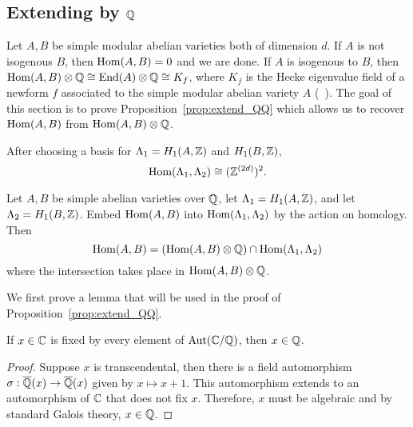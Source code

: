 \subsection{Extending by $\mathbb{Q}$}%
\label{sub:extending_by_qq_}

Let $A, B$ be simple modular abelian varieties both of dimension $d$. If $A$ is
not isogenous $B$, then $\operatorname{Hom}(A, B)=0$ and we are done. If $A$ is isogenous to
$B$, then $\operatorname{Hom}(A,B)\otimes \mathbb{Q} \cong \operatorname{End}(A)\otimes \mathbb{Q}\cong K_f$, where $K_f$
is the Hecke eigenvalue field of a newform $f$ associated to the simple modular
abelian variety $A$ (~\cite[Prop 7.14]{shimura:intro}). The goal of this section is to prove
Proposition~\ref{prop:extend_QQ} which allows us to recover $\operatorname{Hom}(A,B)$ from
$\operatorname{Hom}(A,B)\otimes \mathbb{Q}$.

After choosing a basis for $\Lambda_1 = H_1(A, \mathbb{Z})$ and $H_1(B, \mathbb{Z})$, 
\[
    \operatorname{Hom}(\Lambda_1, \Lambda_2) \cong (\mathbb{Z}^{(2d)})^2.
\]
\begin{proposition}%
    \label{prop:extend_QQ}
    Let $A, B$ be simple abelian varieties over $\mathbb{Q}$, let $\Lambda_1=H_1(A,
    \mathbb{Z})$, and let $\Lambda_2=H_1(B, \mathbb{Z})$. Embed $\operatorname{Hom}(A, B)$ into
    $\operatorname{Hom}(\Lambda_1, \Lambda_2)$ by the action on homology. Then
    \[
        \operatorname{Hom}(A, B) = 
        (\operatorname{Hom}(A, B) \otimes \mathbb{Q})\cap \operatorname{Hom}(\Lambda_1, \Lambda_2)
    \]
    where the intersection takes place in $\operatorname{Hom}(A,B)\otimes \mathbb{Q}$.
\end{proposition}

We first prove a lemma that will be used in the proof of
Proposition~\ref{prop:extend_QQ}.

\begin{lemma}%
    \label{lem:aut}
    If $x\in \mathbb{C}$ is fixed by every element of $\operatorname{Aut}(\mathbb{C}/\mathbb{Q})$, then $x\in
    \mathbb{Q}$.
\end{lemma}
\begin{proof}
    Suppose $x$ is transcendental, then there is a field automorphism
    $\sigma:\overline{\mathbb{Q}}(x)\to\overline{\mathbb{Q}}(x)$ given by $x\mapsto x+1$. This automorphism
    extends to an automorphism of $\mathbb{C}$ that does not fix $x$. Therefore, $x$
    must be algebraic and by standard Galois theory, $x\in \mathbb{Q}$.
\end{proof}

